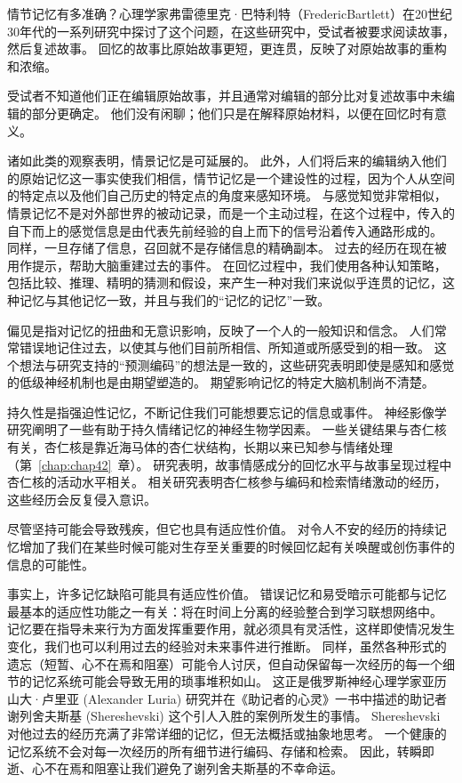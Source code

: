 \begin{proposition}[情节记忆在回忆过程中会发生变化] \label{box:52_1}
	
	\quad \quad 情节记忆有多准确？心理学家弗雷德里克·巴特利特（FredericBartlett）在20世纪30年代的一系列研究中探讨了这个问题，在这些研究中，受试者被要求阅读故事，然后复述故事。
	回忆的故事比原始故事更短，更连贯，反映了对原始故事的重构和浓缩。
	
	\quad \quad 受试者不知道他们正在编辑原始故事，并且通常对编辑的部分比对复述故事中未编辑的部分更确定。
	他们没有闲聊；他们只是在解释原始材料，以便在回忆时有意义。
	
	\quad \quad 诸如此类的观察表明，情景记忆是可延展的。
	此外，人们将后来的编辑纳入他们的原始记忆这一事实使我们相信，情节记忆是一个建设性的过程，因为个人从空间的特定点以及他们自己历史的特定点的角度来感知环境。
	与感觉知觉非常相似，情景记忆不是对外部世界的被动记录，而是一个主动过程，在这个过程中，传入的自下而上的感觉信息是由代表先前经验的自上而下的信号沿着传入通路形成的。
	同样，一旦存储了信息，召回就不是存储信息的精确副本。
	过去的经历在现在被用作提示，帮助大脑重建过去的事件。
	在回忆过程中，我们使用各种认知策略，包括比较、推理、精明的猜测和假设，来产生一种对我们来说似乎连贯的记忆，这种记忆与其他记忆一致，并且与我们的“记忆的记忆”一致。
	
\end{proposition}


偏见是指对记忆的扭曲和无意识影响，反映了一个人的一般知识和信念。
人们常常错误地记住过去，以使其与他们目前所相信、所知道或所感受到的相一致。
这个想法与研究支持的“预测编码”的想法是一致的，这些研究表明即使是感知和感觉的低级神经机制也是由期望塑造的。
期望影响记忆的特定大脑机制尚不清楚。


持久性是指强迫性记忆，不断记住我们可能想要忘记的信息或事件。
神经影像学研究阐明了一些有助于持久情绪记忆的神经生物学因素。
一些关键结果与杏仁核有关，杏仁核是靠近海马体的杏仁状结构，长期以来已知参与情绪处理（第~\ref{chap:chap42}~章）。
研究表明，故事情感成分的回忆水平与故事呈现过程中杏仁核的活动水平相关。
相关研究表明杏仁核参与编码和检索情绪激动的经历，这些经历会反复侵入意识。


尽管坚持可能会导致残疾，但它也具有适应性价值。
对令人不安的经历的持续记忆增加了我们在某些时候可能对生存至关重要的时候回忆起有关唤醒或创伤事件的信息的可能性。


事实上，许多记忆缺陷可能具有适应性价值。
错误记忆和易受暗示可能都与记忆最基本的适应性功能之一有关：将在时间上分离的经验整合到学习联想网络中。
记忆要在指导未来行为方面发挥重要作用，就必须具有灵活性，这样即使情况发生变化，我们也可以利用过去的经验对未来事件进行推断。
同样，虽然各种形式的遗忘（短暂、心不在焉和阻塞）可能令人讨厌，但自动保留每一次经历的每一个细节的记忆系统可能会导致无用的琐事堆积如山。
这正是俄罗斯神经心理学家亚历山大·卢里亚 (Alexander Luria) 研究并在《助记者的心灵》一书中描述的助记者谢列舍夫斯基 (Shereshevski) 这个引人入胜的案例所发生的事情。
Shereshevski 对他过去的经历充满了非常详细的记忆，但无法概括或抽象地思考。
一个健康的记忆系统不会对每一次经历的所有细节进行编码、存储和检索。
因此，转瞬即逝、心不在焉和阻塞让我们避免了谢列舍夫斯基的不幸命运。



